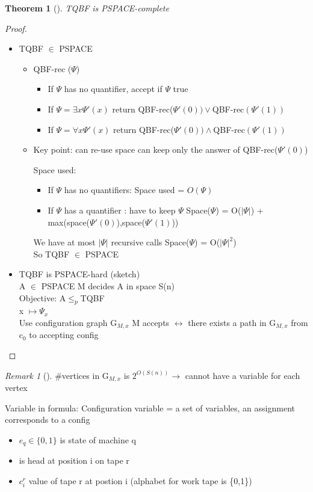 \documentclass{article}
\newtheorem{theorem}{Theorem}
\theoremstyle{definition}
\theoremstyle{remark}
\newtheorem*{remark}{Remark}
\newcommand{\Thm}[3]{\begin{theorem}[#1]\label{#2}#3\end{theorem}}
\newcommand{\Rem}[3]{\begin{remark}[#1]\label{#2}#3\end{remark}}
\newcommand{\Proof}[1]{\begin{proof}#1\end{proof}}
\begin{document}
\Thm{}{}{TQBF is PSPACE-complete}
\Proof{~\\
\begin{itemize}
		\item TQBF $\in$ PSPACE
		\begin{itemize}
		\item QBF-rec ($\Psi$)
		\begin{itemize}
			\item If $\Psi$ has no quantifier, accept if $\Psi$ true
			\item If $\Psi = \exists x \Psi'(x)$ return QBF-rec($\Psi'(0))\vee$QBF-rec$(\Psi'(1))$
			\item If $\Psi = \forall x \Psi'(x)$ return QBF-rec($\Psi'(0))\wedge$QBF-rec$(\Psi'(1))$
		\end{itemize}
		\item Key point: can re-use space can keep only the answer of QBF-rec($\Psi'(0)$)
		
		Space used:
		\begin{itemize}
			\item If $\Psi$ has no quantifiers: Space used = $O(\Psi)$
			\item If $\Psi$ has a quantifier : have to keep $\Psi$ Space($\Psi$) = O($|\Psi|$) + max(space($\Psi'(0)$),space($\Psi'(1)$))
		\end{itemize}

		We have at most $|\Psi|$ recursive calls Space($\Psi$) = O($|\Psi|^2$)\\

		So TQBF $\in$ PSPACE\\
	\end{itemize}

\item TQBF is PSPACE-hard (sketch)\\
A $\in$ PSPACE M decides A in space S(n)\\
Objective: A$\leq_p$TQBF\\
x $\mapsto \Psi_x$\\
Use configuration graph G$_{M,x}$
M accepts $\leftrightarrow$ there exists a path in G$_{M,x}$ from c$_0$ to accepting config
\end{itemize}}

\Rem{}{}{\#vertices in G$_{M,x}$ is $2^{O(S(n))} \rightarrow$ cannot have a variable for each vertex}
	
Variable in formula:
	Configuration variable = a set of variables, an assignment corresponds to a config
	\begin{itemize}
		\item $e_q \in \{0,1\}$ is state of machine q
		\item is head at position i on tape r
		\item $c_i^r$ value of tape r at postion i (alphabet for work tape is \{0,1\})
	\end{itemize}
	
\end{document}
